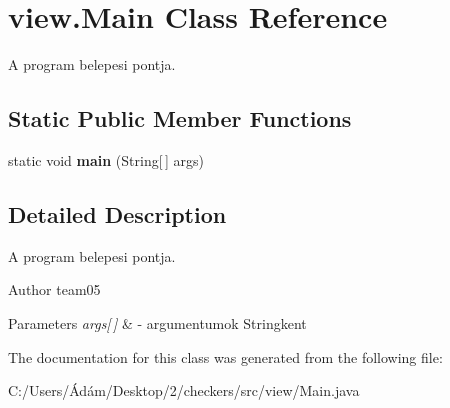 \hypertarget{classview_1_1_main}{}\section{view.\+Main Class Reference}
\label{classview_1_1_main}


A program belepesi pontja.  


\subsection*{Static Public Member Functions}
\begin{DoxyCompactItemize}
\item 
\hypertarget{classview_1_1_main_a88ae4bf785b56ccb618a504b196ca6d9}{}static void {\bfseries main} (String\mbox{[}$\,$\mbox{]} args)\label{classview_1_1_main_a88ae4bf785b56ccb618a504b196ca6d9}

\end{DoxyCompactItemize}


\subsection{Detailed Description}
A program belepesi pontja. 

\begin{DoxyAuthor}{Author}
team05 
\end{DoxyAuthor}

\begin{DoxyParams}{Parameters}
{\em args\mbox{[}$\,$\mbox{]}} & -\/ argumentumok Stringkent \\
\hline
\end{DoxyParams}


The documentation for this class was generated from the following file\+:\begin{DoxyCompactItemize}
\item 
C\+:/\+Users/Ádám/\+Desktop/2/checkers/src/view/Main.\+java\end{DoxyCompactItemize}
